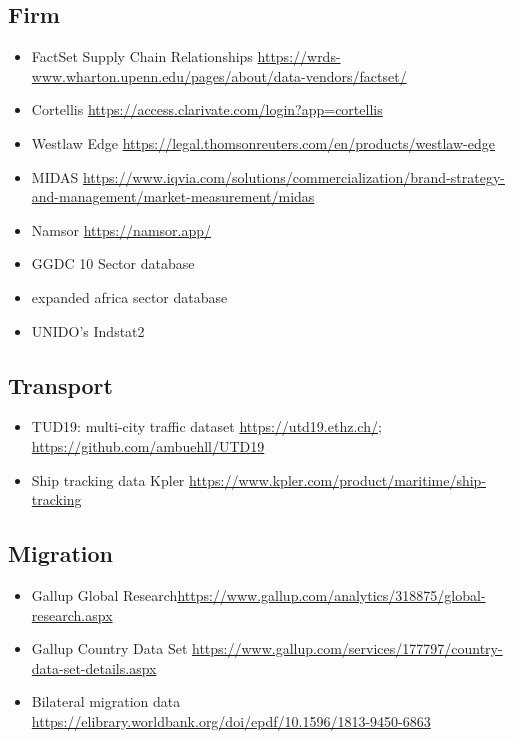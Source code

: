 \documentclass[10pt]{article} %
\begin{document}
    \subsection{Firm}
        \begin{itemize}
            \item FactSet Supply Chain Relationships \url{https://wrds-www.wharton.upenn.edu/pages/about/data-vendors/factset/}
            \item Cortellis \url{https://access.clarivate.com/login?app=cortellis}
            \item Westlaw Edge \url{https://legal.thomsonreuters.com/en/products/westlaw-edge}
            \item MIDAS \url{https://www.iqvia.com/solutions/commercialization/brand-strategy-and-management/market-measurement/midas}
            \item Namsor \url{https://namsor.app/}
            \item GGDC 10 Sector database
            \item expanded africa sector database
            \item UNIDO's Indstat2
        \end{itemize}
    
    \subsection{Transport}
        \begin{itemize}
            \item TUD19: multi-city traffic dataset \url{https://utd19.ethz.ch/}; \url{https://github.com/ambuehll/UTD19}
            \item Ship tracking data Kpler \url{https://www.kpler.com/product/maritime/ship-tracking}
        \end{itemize}

    \subsection{Migration}
        \begin{itemize}
            \item Gallup Global Research\url{https://www.gallup.com/analytics/318875/global-research.aspx}
            \item Gallup Country Data Set \url{https://www.gallup.com/services/177797/country-data-set-details.aspx}
            \item Bilateral migration data \url{https://elibrary.worldbank.org/doi/epdf/10.1596/1813-9450-6863}
        \end{itemize}
\end{document}
